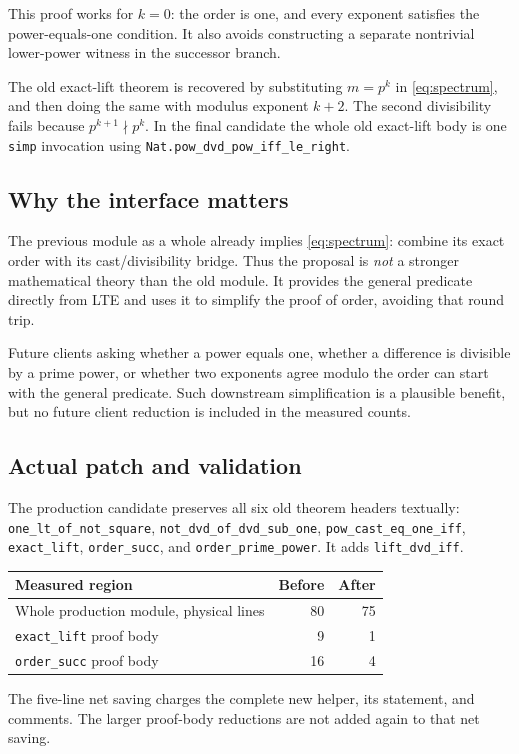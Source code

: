 \documentclass[11pt]{article}
\newcommand{\code}[1]{\nolinkurl{#1}}
\begin{document}
This proof works for \(k=0\): the order is one, and every exponent satisfies the
power-equals-one condition. It also avoids constructing a separate nontrivial
lower-power witness in the successor branch.

The old exact-lift theorem is recovered by substituting \(m=p^k\) in
\eqref{eq:spectrum}, and then doing the same with modulus exponent \(k+2\).
The second divisibility fails because \(p^{k+1}\nmid p^k\). In the final
candidate the whole old exact-lift body is one \code{simp} invocation using
\code{Nat.pow_dvd_pow_iff_le_right}.

\subsection{Why the interface matters}
The previous module as a whole already implies
\eqref{eq:spectrum}: combine its exact order with its cast/divisibility bridge.
Thus the proposal is \emph{not} a stronger mathematical theory than the old
module. It provides the general predicate directly from LTE and uses it to
simplify the proof of order, avoiding that round trip.

Future clients asking whether a power equals one, whether a difference is
divisible by a prime power, or whether two exponents agree modulo the order can
start with the general predicate. Such downstream simplification is a plausible
benefit, but no future client reduction is included in the measured counts.

\subsection{Actual patch and validation}
The production candidate preserves all six old theorem headers textually:
\code{one_lt_of_not_square}, \code{not_dvd_of_dvd_sub_one},
\code{pow_cast_eq_one_iff}, \code{exact_lift}, \code{order_succ}, and
\code{order_prime_power}. It adds \code{lift_dvd_iff}.

\begin{center}
\begin{tabular}{@{}lrr@{}}
\toprule
Measured region & Before & After\\
\midrule
Whole production module, physical lines & 80 & 75\\
\code{exact_lift} proof body & 9 & 1\\
\code{order_succ} proof body & 16 & 4\\
\bottomrule
\end{tabular}
\end{center}
The five-line net saving charges the complete new helper, its statement, and
comments. The larger proof-body reductions are not added again to that net
saving.
\end{document}
